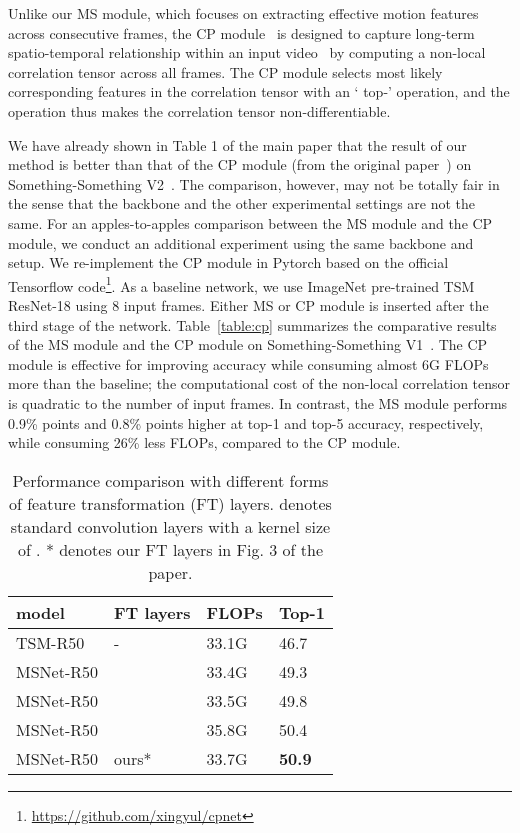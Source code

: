 \documentclass[runningheads]{llncs}
\begin{document}
\smallbreak
{} Unlike our MS module, which focuses on extracting effective motion features across consecutive frames, the CP module~\cite{liu2019learning} is designed to capture long-term spatio-temporal relationship within an input video~\cite{wang2018non} by computing a non-local correlation tensor across all frames.
The CP module selects  most likely corresponding features in the correlation tensor with an ` top-' operation, and the operation thus makes the correlation tensor non-differentiable.

\smallbreak
{}
We have already shown in Table 1 of the main paper that the result of our method is better than that of the CP module (from the original paper~\cite{liu2019learning}) on Something-Something V2~\cite{goyal2017something}. The comparison, however, may not be totally fair in the sense that the backbone and the other experimental settings are not the same. For an apples-to-apples comparison between the MS module and the CP module, we conduct an additional experiment using the same backbone and setup. We re-implement the CP module in Pytorch based on the official Tensorflow code\footnote{\url{https://github.com/xingyul/cpnet}}. As a baseline network, we use ImageNet pre-trained TSM ResNet-18 using 8 input frames.
Either MS or CP module is inserted after the third stage of the network.
Table~\ref{table:cp} summarizes the comparative results of the MS module and the CP module on Something-Something V1~\cite{goyal2017something}.
The CP module is effective for improving accuracy while consuming almost 6G FLOPs more than the baseline; the computational cost of the non-local correlation tensor is quadratic to the number of input frames. In contrast, the MS module performs 0.9\% points and 0.8\% points higher at top-1 and top-5 accuracy, respectively, while consuming 26\% less FLOPs, compared to the CP module. 


\begin{table}[t]
	\centering
	\caption{Performance comparison with different forms of feature transformation (FT) layers.  denotes  standard convolution layers with a kernel size of . * denotes our FT layers in Fig. 3 of the paper.
		}
	\label{table:dws}
    \begin{tabular}[t]{L{2.5cm}|C{2.0cm}|C{1.2cm}|C{1.2cm}}  
    \toprule
    model & FT layers & FLOPs & Top-1 \\
    \hline
      TSM-R50     & -     & 33.1G & 46.7    \\
      \hline
      MSNet-R50   &      & 33.4G & 49.3     \\
      MSNet-R50   &      & 33.5G & 49.8     \\      
      MSNet-R50   &      & 35.8G & 50.4     \\      
      MSNet-R50   & ours*     & 33.7G & \textbf{50.9}     \\            
      \bottomrule
    \end{tabular}
\end{table}
\end{document}
